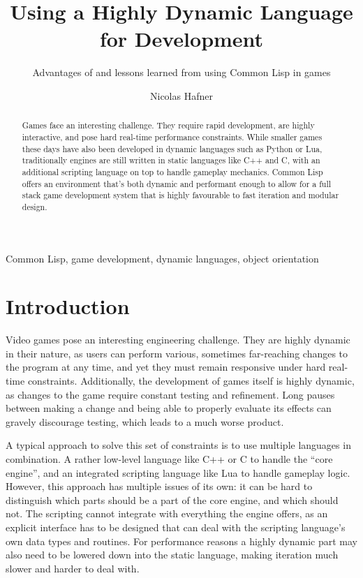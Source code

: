 \documentclass[a4paper]{paper}
\title{Using a Highly Dynamic Language for Development}
\subtitle{Advantages of and lessons learned from using Common Lisp in games}
\author{Nicolas Hafner}
\begin{document}
\twocolumn[\maketitle]

\begin{abstract}
  Games face an interesting challenge. They require rapid development, are highly interactive, and pose hard real-time performance constraints. While smaller games these days have also been developed in dynamic languages such as Python or Lua, traditionally engines are still written in static languages like C++ and C, with an additional scripting language on top to handle gameplay mechanics. Common Lisp offers an environment that's both dynamic and performant enough to allow for a full stack game development system that is highly favourable to fast iteration and modular design.
\end{abstract}
\begin{keywords}
  Common Lisp, game development, dynamic languages, object orientation
\end{keywords}

\def\abovecaptionskip{1pt}
\def\listingautorefname{Listing}
\def\figureautorefname{Figure}

\section{Introduction}
Video games pose an interesting engineering challenge. They are highly dynamic in their nature, as users can perform various, sometimes far-reaching changes to the program at any time, and yet they must remain responsive under hard real-time constraints. Additionally, the development of games itself is highly dynamic, as changes to the game require constant testing and refinement. Long pauses between making a change and being able to properly evaluate its effects can gravely discourage testing, which leads to a much worse product.

A typical approach to solve this set of constraints is to use multiple languages in combination. A rather low-level language like C++ or C to handle the ``core engine'', and an integrated scripting language like Lua to handle gameplay logic. However, this approach has multiple issues of its own: it can be hard to distinguish which parts should be a part of the core engine, and which should not. The scripting cannot integrate with everything the engine offers, as an explicit interface has to be designed that can deal with the scripting language's own data types and routines. For performance reasons a highly dynamic part may also need to be lowered down into the static language, making iteration much slower and harder to deal with.
\end{document}
